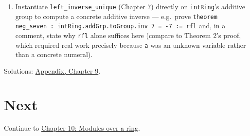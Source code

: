 \begin{enumerate}
  Prove \texttt{theorem neg\_\allowbreak{}mul (a b : R) : Rg.mul (Rg.addGrp.toGroup.inv a) b = Rg.addGrp.toGroup.inv (Rg.mul a b)}. Strategy: this is ``show \(x = -(ab)\),'' hence reduce through \texttt{left\_\allowbreak{}inverse\_\allowbreak{}unique} to ``show \(x + ab = 0\),'' then look for a \texttt{right\_\allowbreak{}distrib}-shaped simplification of \((-a)\cdot b + a \cdot b\), exactly as in Theorem 2. \texttt{mul\_\allowbreak{}zero\_\allowbreak{}left} (proved in Theorem 2's section) is required at the end, the same way Theorem 2 itself used it.
\item
  Instantiate \texttt{left\_\allowbreak{}inverse\_\allowbreak{}unique} (Chapter 7) directly on \texttt{intRing}'s additive group to compute a concrete additive inverse --- e.g.~prove \texttt{theorem neg\_\allowbreak{}seven : intRing.addGrp.toGroup.inv 7 = -\allowbreak{}7 := rfl} and, in a comment, state why \texttt{rfl} alone suffices here (compare to Theorem 2's proof, which required real work precisely because \texttt{a} was an unknown variable rather than a concrete numeral).
\end{enumerate}

Solutions: \hyperref[sec:14-appendix-solutions:08-chapter-9:1]{Appendix, Chapter 9}.

\section{Next}\label{sec:09-ring-theorems:04-exercises:2}

Continue to \hyperref[sec:10-modules:00-index:1]{Chapter 10: Modules over a ring}.

